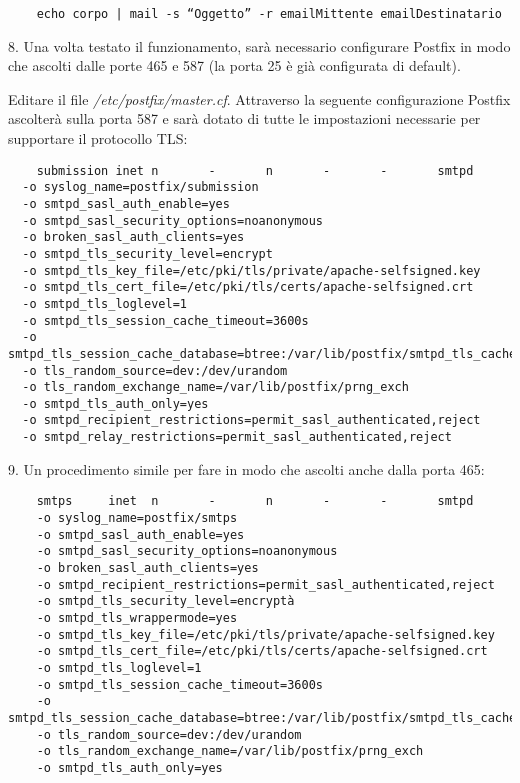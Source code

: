 \begin{verbatim}
    echo corpo | mail -s “Oggetto” -r emailMittente emailDestinatario 
\end{verbatim}

8. Una volta testato il funzionamento, sarà necessario configurare Postfix in modo che ascolti dalle porte 465 e 587 
(la porta 25 è già configurata di default).

Editare il file \textit{/etc/postfix/master.cf}. Attraverso la seguente configurazione Postfix ascolterà 
sulla porta 587 e sarà dotato di tutte le impostazioni necessarie per supportare il protocollo TLS:

\begin{verbatim}
    submission inet n       -       n       -       -       smtpd
  -o syslog_name=postfix/submission
  -o smtpd_sasl_auth_enable=yes
  -o smtpd_sasl_security_options=noanonymous
  -o broken_sasl_auth_clients=yes
  -o smtpd_tls_security_level=encrypt
  -o smtpd_tls_key_file=/etc/pki/tls/private/apache-selfsigned.key
  -o smtpd_tls_cert_file=/etc/pki/tls/certs/apache-selfsigned.crt
  -o smtpd_tls_loglevel=1
  -o smtpd_tls_session_cache_timeout=3600s
  -o smtpd_tls_session_cache_database=btree:/var/lib/postfix/smtpd_tls_cache
  -o tls_random_source=dev:/dev/urandom
  -o tls_random_exchange_name=/var/lib/postfix/prng_exch
  -o smtpd_tls_auth_only=yes
  -o smtpd_recipient_restrictions=permit_sasl_authenticated,reject
  -o smtpd_relay_restrictions=permit_sasl_authenticated,reject
\end{verbatim}

9. Un procedimento simile per fare in modo che ascolti anche dalla porta 465:

\begin{verbatim}
    smtps     inet  n       -       n       -       -       smtpd
    -o syslog_name=postfix/smtps
    -o smtpd_sasl_auth_enable=yes
    -o smtpd_sasl_security_options=noanonymous
    -o broken_sasl_auth_clients=yes
    -o smtpd_recipient_restrictions=permit_sasl_authenticated,reject
    -o smtpd_tls_security_level=encryptà
    -o smtpd_tls_wrappermode=yes
    -o smtpd_tls_key_file=/etc/pki/tls/private/apache-selfsigned.key
    -o smtpd_tls_cert_file=/etc/pki/tls/certs/apache-selfsigned.crt
    -o smtpd_tls_loglevel=1
    -o smtpd_tls_session_cache_timeout=3600s
    -o smtpd_tls_session_cache_database=btree:/var/lib/postfix/smtpd_tls_cache
    -o tls_random_source=dev:/dev/urandom
    -o tls_random_exchange_name=/var/lib/postfix/prng_exch
    -o smtpd_tls_auth_only=yes
\end{verbatim}

